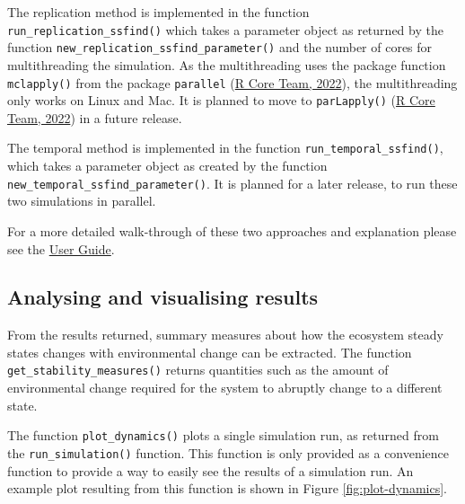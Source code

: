 \documentclass[
]{article}
\begin{document}
The replication method is implemented in the function
\texttt{run\_replication\_ssfind()} which takes a parameter object as
returned by the function \texttt{new\_replication\_ssfind\_parameter()}
and the number of cores for multithreading the simulation. As the
multithreading uses the package function \texttt{mclapply()} from the
package \texttt{parallel} (\protect\hyperlink{ref-RCoreTeam2022}{R Core
Team, 2022}), the multithreading only works on Linux and Mac. It is
planned to move to \texttt{parLapply()}
(\protect\hyperlink{ref-RCoreTeam2022}{R Core Team, 2022}) in a future
release.

The temporal method is implemented in the function
\texttt{run\_temporal\_ssfind()}, which takes a parameter object as
created by the function \texttt{new\_temporal\_ssfind\_parameter()}. It
is planned for a later release, to run these two simulations in
parallel.

For a more detailed walk-through of these two approaches and explanation
please see the
\href{https://uzh-peg.r-universe.dev/articles/microxanox/User-guide.html}{User
Guide}.

\hypertarget{analysing-and-visualising-results}{%
\subsection{Analysing and visualising
results}\label{analysing-and-visualising-results}}

From the results returned, summary measures about how the ecosystem
steady states changes with environmental change can be extracted. The
function \texttt{get\_stability\_measures()} returns quantities such as
the amount of environmental change required for the system to abruptly
change to a different state.

The function \texttt{plot\_dynamics()} plots a single simulation run, as
returned from the \texttt{run\_simulation()} function. This function is
only provided as a convenience function to provide a way to easily see
the results of a simulation run. An example plot resulting from this
function is shown in Figure \ref{fig:plot-dynamics}.
\end{document}
